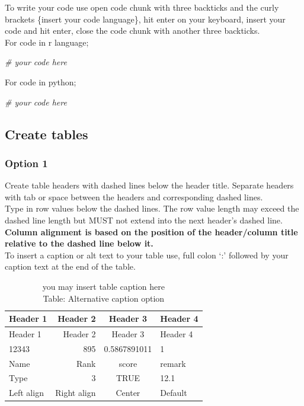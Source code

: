 \documentclass[
]{book}
\newenvironment{Shaded}{\begin{snugshade}}{\end{snugshade}}
\newcommand{\CommentTok}[1]{\textcolor[rgb]{0.56,0.35,0.01}{\textit{#1}}}
\begin{document}
To write your code use open code chunk with three backticks
and the curly brackets \{insert your code language\}, hit enter on your keyboard, insert your code and hit enter, close the code chunk with another three backticks.\\
For code in r language;

\begin{Shaded}
\begin{Highlighting}[]
\CommentTok{\# your code here}
\end{Highlighting}
\end{Shaded}

For code in python;

\begin{Shaded}
\begin{Highlighting}[]
\CommentTok{\# your code here}
\end{Highlighting}
\end{Shaded}

\hypertarget{create-tables}{%
\subsection{Create tables}\label{create-tables}}

\hypertarget{option-1}{%
\subsubsection{Option 1}\label{option-1}}

Create table headers with dashed lines below the header title. Separate headers with tab or space between the headers and corresponding dashed lines.\\
Type in row values below the dashed lines. The row value length may exceed the dashed line length but MUST not extend into the next header's dashed line.\\
\textbf{Column alignment is based on the position of the header/column title relative to the dashed line below it.}\\
To insert a caption or alt text to your table use, full colon `:' followed by your caption text at the end of the table.

\begin{longtable}[]{@{}lrcl@{}}
\caption{you may insert table caption here\\
Table: Alternative caption option}\tabularnewline
\toprule
Header 1 & Header 2 & Header 3 & Header 4 \\
\midrule
\endfirsthead
\toprule
Header 1 & Header 2 & Header 3 & Header 4 \\
\midrule
\endhead
12343 & 895 & 0.5867891011 & 1 \\
Name & Rank & score & remark \\
Type & 3 & TRUE & 12.1 \\
Left align & Right align & Center & Default \\
\bottomrule
\end{longtable}
\end{document}
